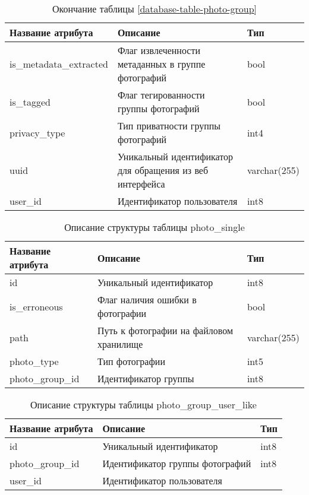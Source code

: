 \begin{table}[H]
  \caption*{\onehalfspacing Окончание таблицы \ref{database-table-photo-group}}
  \begin{tabular}{|p{6cm}|p{6cm}|p{4cm}|}
  \hline Название атрибута & Описание & Тип \\
  \hline is_metadata_extracted & Флаг извлеченности метаданных в группе фотографий & bool \\
  \hline is_tagged & Флаг тегированности группы фотографий & bool \\
  \hline privacy_type & Тип приватности группы фотографий & int4 \\
  \hline uuid & Уникальный идентификатор для обращения из веб интерфейса & varchar(255) \\
  \hline user_id & Идентификатор пользователя & int8 \\
  \hline
  \end{tabular}
\end{table}

\begin{table}[H]
  \caption{\onehalfspacing Описание структуры таблицы photo_single}\label{database-table-photo-single}
  \begin{tabular}{|p{6cm}|p{6cm}|p{4cm}|}
  \hline Название атрибута & Описание & Тип \\
  \hline id & Уникальный идентификатор & int8 \\
  \hline is_erroneous & Флаг наличия ошибки в фотографии & bool \\
  \hline path & Путь к фотографии на файловом хранилище & varchar(255) \\
  \hline photo_type & Тип фотографии & int5 \\
  \hline photo_group_id & Идентификатор группы & int8 \\
  \hline
  \end{tabular}
\end{table}

\begin{table}[H]
  \caption{\onehalfspacing Описание структуры таблицы photo_group_user_like}\label{database-table-photo-group-user-like}
  \begin{tabular}{|p{6cm}|p{6cm}|p{4cm}|}
  \hline Название атрибута & Описание & Тип \\
  \hline id & Уникальный идентификатор & int8 \\
  \hline photo_group_id & Идентификатор группы фотографий & int8 \\
  \hline user_id & Идентификатор пользователя\\
  \hline 
  \end{tabular}
\end{table}

